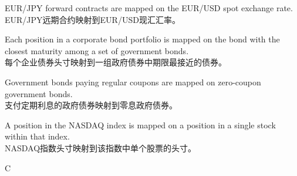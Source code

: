 \documentclass{article}
\begin{document}
\begin{choices}
    \item EUR/JPY forward contracts are mapped on the EUR/USD spot exchange rate.\\
        EUR/JPY远期合约映射到EUR/USD现汇汇率。
    \item Each position in a corporate bond portfolio is mapped on the bond with the closest maturity among a set of government bonds.\\
        每个企业债券头寸映射到一组政府债券中期限最接近的债券。
    \item Government bonds paying regular coupons are mapped on zero-coupon government bonds.\\
        支付定期利息的政府债券映射到零息政府债券。
    \item A position in the NASDAQ index is mapped on a position in a single stock within that index.\\
        NASDAQ指数头寸映射到该指数中单个股票的头寸。
\end{choices}

\begin{correctanswer}
    C
\end{correctanswer}
\end{document}
